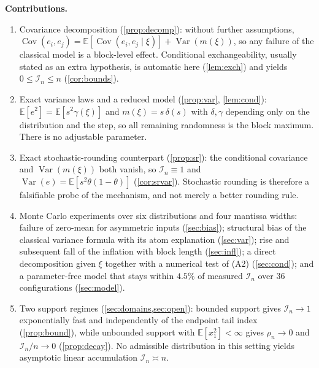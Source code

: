 \documentclass[review,hidelinks,oneeqnum,onetabnum,onefignum,onethmnum]{siamart251216}
\begin{document}
\medskip
\noindent\textbf{Contributions.}

\begin{enumerate}
\item Covariance decomposition (\cref{prop:decomp}): without further
assumptions,
$\operatorname{Cov}(e_i,e_j)=\mathbb{E}[\operatorname{Cov}(e_i,e_j\mid\xi)]
+\operatorname{Var}(m(\xi))$, so any failure of the classical model is a
block-level effect. Conditional exchangeability, usually stated as an extra
hypothesis, is automatic here (\cref{lem:exch}) and yields
$0\le\mathcal I_n\le n$ (\cref{cor:bounds}).

\item Exact variance laws and a reduced model
(\cref{prop:var}, \cref{lem:cond}): $\mathbb{E}[e^2]=\mathbb{E}[s^2\gamma(\xi)]$
and $m(\xi)=s\,\delta(s)$ with $\delta,\gamma$ depending only on the
distribution and the step, so all remaining randomness is the block maximum.
There is no adjustable parameter.

\item Exact stochastic-rounding counterpart (\cref{prop:sr}): the conditional
covariance and $\operatorname{Var}(m(\xi))$ both vanish, so
$\mathcal I_n\equiv1$ and $\operatorname{Var}(e)=\mathbb{E}[s^2\theta(1-\theta)]$
(\cref{cor:srvar}). Stochastic rounding is therefore a falsifiable probe of the
mechanism, and not merely a better rounding rule.

\item Monte Carlo experiments over six distributions and four mantissa widths:
failure of zero-mean for asymmetric inputs (\cref{sec:bias}); structural bias
of the classical variance formula with its atom explanation
(\cref{sec:var}); rise and subsequent fall of the inflation with block length
(\cref{sec:infl}); a direct decomposition given $\xi$ together with a numerical
test of (A2) (\cref{sec:cond}); and a parameter-free model that stays within
$4.5\%$ of measured $\mathcal I_n$ over $36$ configurations
(\cref{sec:model}).

\item Two support regimes (\cref{sec:domains,sec:open}): bounded support gives
$\mathcal I_n\to1$ exponentially fast and independently of the endpoint tail
index (\cref{prop:bound}), while unbounded support with
$\mathbb{E}[x_1^2]<\infty$ gives $\rho_n\to0$ and $\mathcal I_n/n\to0$
(\cref{prop:decay}). No admissible distribution in this setting yields
asymptotic linear accumulation $\mathcal I_n\asymp n$.
\end{enumerate}
\end{document}
